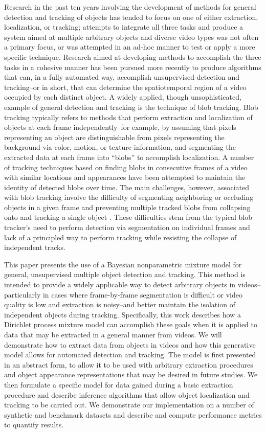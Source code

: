 \documentclass[smallcondensed, final]{svjour3}
\begin{document}
Research in the past ten years involving the development of methods for general detection and tracking of objects has tended to focus on one of either extraction, localization, or tracking; attempts to integrate all three tasks and produce a system aimed at multiple arbitrary objects and diverse video types was not often a primary focus, or was attempted in an ad-hoc manner to test or apply a more specific technique. Research aimed at developing methods to accomplish the three tasks in a cohesive manner has been pursued more recently to produce algorithms that can, in a fully automated way, accomplish unsupervised detection and tracking--or in short, that can determine the spatiotemporal region of a video occupied by each distinct object. A widely applied, though unsophisticated, example of general detection and tracking is the technique of blob tracking. Blob tracking typically refers to methods that perform extraction and localization of objects at each frame independently--for example, by assuming that pixels representing an object are distinguishable from pixels representing the background via color, motion, or texture information, and segmenting the extracted data at each frame into ``blobs'' to accomplish localization. A number of tracking techniques based on finding blobs in consecutive frames of a video with similar locations and appearances have been attempted to maintain the identity of detected blobs over time. The main challenges, however, associated with blob tracking involve the difficulty of segmenting neighboring or occluding objects in a given frame \cite{zhao2004tracking} and preventing multiple tracked blobs from collapsing onto and tracking a single object \cite{vermaak_2003}. These difficulties stem from the typical blob tracker's need to perform detection via segmentation on individual frames and lack of a principled way to perform tracking while resisting the collapse of independent tracks.

This paper presents the use of a Bayesian nonparametric mixture model for general, unsupervised multiple object detection and tracking. This method is intended to provide a widely applicable way to detect arbitrary objects in videos--particularly in cases where frame-by-frame segmentation is difficult or video quality is low and extraction is noisy--and better maintain the isolation of independent objects during tracking. Specifically, this work describes how a Dirichlet process mixture model can accomplish these goals when it is applied to data that may be extracted in a general manner from videos. We will demonstrate how to extract data from objects in videos and how this generative model allows for automated detection and tracking. The model is first presented in an abstract form, to allow it to be used with arbitrary extraction procedures and object appearance representations that may be desired in future studies. We then formulate a specific model for data gained during a basic extraction procedure and describe inference algorithms that allow object localization and tracking to be carried out. We demonstrate our implementation on a number of synthetic and benchmark datasets and describe and compute performance metrics to quantify results. 
\end{document}
